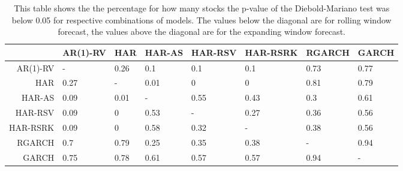 \begin{table}[ht]
\centering
\begin{tabular}{rlllllll}
  \hline
 & AR(1)-RV & HAR & HAR-AS & HAR-RSV & HAR-RSRK & RGARCH & GARCH \\ 
  \hline
AR(1)-RV & - & 0.26 & 0.1 & 0.1 & 0.1 & 0.73 & 0.77 \\ 
  HAR & 0.27 & - & 0.01 & 0 & 0 & 0.81 & 0.79 \\ 
  HAR-AS & 0.09 & 0.01 & - & 0.55 & 0.43 & 0.3 & 0.61 \\ 
  HAR-RSV & 0.09 & 0 & 0.53 & - & 0.27 & 0.36 & 0.56 \\ 
  HAR-RSRK & 0.09 & 0 & 0.58 & 0.32 & - & 0.38 & 0.56 \\ 
  RGARCH & 0.7 & 0.79 & 0.25 & 0.35 & 0.38 & - & 0.94 \\ 
  GARCH & 0.75 & 0.78 & 0.61 & 0.57 & 0.57 & 0.94 & - \\ 
   \hline
\end{tabular}
\caption[DM test below 0.05]{This table shows the the percentage for how many stocks the p-value of the Diebold-Mariano test was below 0.05 for respective combinations of models.
                The values below the diagonal are for rolling window forecast, the values above the diagonal are for the expanding window forecast.} 
\label{Table:DM_test_threshold}
\end{table}
